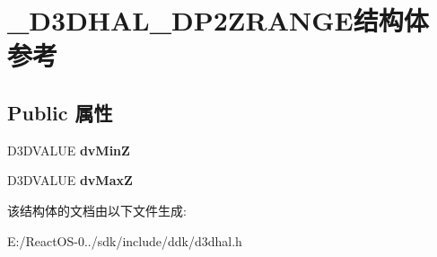 \hypertarget{struct___d3_d_h_a_l___d_p2_z_r_a_n_g_e}{}\section{\+\_\+\+D3\+D\+H\+A\+L\+\_\+\+D\+P2\+Z\+R\+A\+N\+G\+E结构体 参考}
\label{struct___d3_d_h_a_l___d_p2_z_r_a_n_g_e}
\subsection*{Public 属性}
\begin{DoxyCompactItemize}
\item 
\mbox{\label{struct___d3_d_h_a_l___d_p2_z_r_a_n_g_e_a938147ee6441305e113efdb44a9f81dd}} 
D3\+D\+V\+A\+L\+UE {\bfseries dv\+MinZ}
\item 
\mbox{\label{struct___d3_d_h_a_l___d_p2_z_r_a_n_g_e_aaafe1a78d7c7a8d797a118cc243aea37}} 
D3\+D\+V\+A\+L\+UE {\bfseries dv\+MaxZ}
\end{DoxyCompactItemize}


该结构体的文档由以下文件生成\+:\begin{DoxyCompactItemize}
\item 
E\+:/\+React\+O\+S-\/0../sdk/include/ddk/d3dhal.\+h\end{DoxyCompactItemize}

